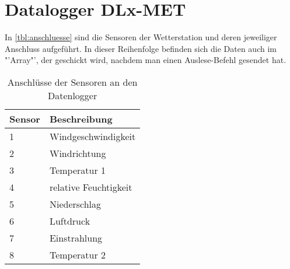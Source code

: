 \section{Datalogger DLx-MET}

In \autoref{tbl:anschluesse} sind die Sensoren der Wetterstation und deren jeweiliger Anschluss aufgeführt. In dieser Reihenfolge befinden sich die Daten auch im "'Array"', der geschickt wird, nachdem man einen Auslese-Befehl gesendet hat.

\begin{table}[H]
	\centering
	\caption{Anschlüsse der Sensoren an den Datenlogger}
	\label{tbl:anschluesse}
	\begin{tabularx}{0.5\textwidth}{XX}  
		\toprule
		\textbf{Sensor} & \textbf{Beschreibung} \\
		\midrule
		1 	&  Windgeschwindigkeit      	\\
		2 	&  Windrichtung 	    \\
		3   &	Temperatur 1 \\
		4   & relative Feuchtigkeit\\
		5   & Niederschlag  \\
		6   & Luftdruck \\
		7   & Einstrahlung \\
		8   & Temperatur 2\\
		\bottomrule
	\end{tabularx}
\end{table}

